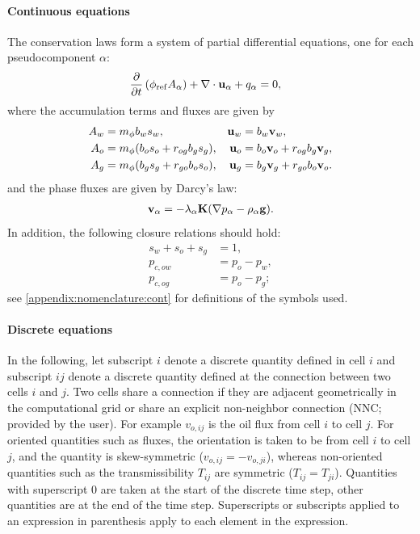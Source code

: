 \paragraph{Continuous equations}

The conservation laws form a system of partial differential
equations, one for each pseudocomponent $\alpha$:
\begin{align}\label{eq:materialbalance-cont}
\frac{\partial}{\partial t} \left(\phi_{\rm ref} A_\alpha \right)
 + \nabla \cdot {\bf u}_\alpha + q_\alpha & = 0,
\end{align}
where the accumulation terms and fluxes are given by
\begin{subequations}
\label{eq:acc}
\begin{align}
  A_w &= m_{\phi} b_{w} s_{w},                          & {\bf u}_w &= b_{w} {\bf v}_{w}, \\
  A_o &= m_{\phi} (b_{o} s_{o} + r_{og}b_{g}s_{g}), & {\bf u}_o &= b_{o} {\bf v}_{o} +
r_{og}b_{g}{\bf v}_{g}, \\
  A_g &= m_{\phi} (b_{g} s_{g} + r_{go}b_{o}s_{o}), & {\bf u}_g &= b_{g} {\bf v}_{g} +
r_{go}b_{o}{\bf v}_{o}.
\end{align}
\end{subequations}
and the phase fluxes are given by Darcy's law:
\begin{align}
  \label{eq:Darcy-mph}
  {\bf v}_\alpha = -\lambda_\alpha {\bf K} (\nabla p_\alpha - \rho_\alpha {\bf g}).
\end{align}
In addition, the following closure relations should hold:
\begin{align}
s_w + s_o + s_g &= 1, \label{eq:fluids-fill-porevolume} \\
p_{c,ow} & = p_{o} - p_{w}, \label{eq:oil-water-capillary} \\
p_{c,og} & = p_{o} - p_{g}; \label{eq:oil-gas-capillary}
\end{align}
see \ref{appendix:nomenclature:cont} for definitions of the
symbols used.

\paragraph{Discrete equations}

In the following, let subscript $i$ denote a discrete quantity defined
in cell $i$ and subscript $ij$ denote a discrete quantity defined at
the connection between two cells $i$ and $j$. Two cells share a
connection if they are adjacent geometrically in the computational
grid or share an explicit non-neighbor connection (NNC; provided by
the user). For example
$v_{o, ij}$ is the oil flux from cell $i$ to cell $j$. For
oriented quantities such as fluxes, the orientation is taken to be
from cell $i$ to cell $j$, and the quantity is skew-symmetric
($v_{o,ij} = -v_{o,ji}$), whereas non-oriented quantities such as the
transmissibility $T_{ij}$ are symmetric ($T_{ij} = T_{ji}$).
Quantities with superscript 0 are taken at the start of the discrete
time step, other quantities are at the end of the time
step. Superscripts or subscripts applied to an expression in
parenthesis apply to each element in the expression.

